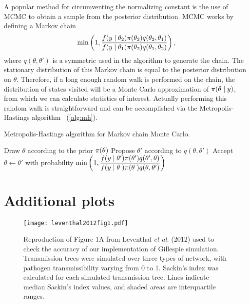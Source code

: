 A popular method for circumventing the normalizing constant is the use of
\gls{MCMC} to obtain a sample from the posterior distribution. \Gls{MCMC} works
by defining a Markov chain  
\[
  \min\left(1, \frac{f(y \mid \theta_2) \pi(\theta_2) q(\theta_2, \theta_1)}
                    {f(y \mid \theta_1) \pi(\theta_2) q(\theta_1, \theta_2)} \right),
\]
where $q(\theta, \theta')$ is a symmetric  used in
the algorithm to generate the chain. The stationary distribution of this Markov
chain is equal to the posterior distribution on $\theta$. Therefore, if a long
enough random walk is performed on the chain, the distribution of states
visited will be a Monte Carlo approximation of $\pi(\theta \mid y)$, from
which we can calculate statistics of interest. Actually performing this random
walk is straightforward and can be accomplished via the Metropolis-Hastings
algorithm~\autocite{metropolis1953equation,hastings1970monte} (\cref{alg:mh}).

\begin{algorithm}
  \caption{Metropolis-Hastings algorithm for Markov chain Monte Carlo.}
  \begin{algorithmic}
    \State Draw $\theta$ according to the prior $\pi(\theta)$
    \Loop
      \State Propose $\theta'$ according to $q(\theta, \theta')$
      \State Accept $\theta \gets \theta'$ with probability
      $\min \left( 1, 
       \dfrac{f(y \mid \theta') \pi(\theta') q(\theta', \theta)}
             {f(y \mid \theta\phantom{'}) \pi(\theta\phantom{'}) q(\theta, \theta')}
       \right)$
    \EndLoop
  \end{algorithmic}
  \label{alg:mh}
\end{algorithm}

\chapter{Additional plots}

\begin{figure}[ht]
  \centering
  \texttt{[image: leventhal2012fig1.pdf]}
  \caption[
    Reproduction of Figure 1A from Leventhal \textit{et al.} (2012) used to
    check the accuracy of our implementation of Gillespie simulation.
  ]{
    Reproduction of Figure 1A from Leventhal \textit{et al.} (2012) used to
    check the accuracy of our implementation of Gillespie simulation.
    Transmission trees were simulated over three types of network, with
    pathogen transmissibility varying from 0 to 1. Sackin's index was
    calculated for each simulated transmission tree. Lines indicate median
    Sackin's index values, and shaded areas are interquartile ranges.
  }
  \label{fig:leventhal}
\end{figure}

